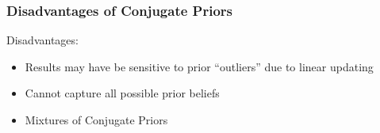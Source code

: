 \documentclass[handout]{beamer}
\begin{document}
\begin{frame}
  \frametitle{Disadvantages of Conjugate Priors}
  Disadvantages: \pause
\begin{itemize}
\item Results  may have be sensitive to prior ``outliers'' due to
  linear updating \pause
\vspace{1.5in}

\item Cannot capture all possible prior beliefs \pause
\item Mixtures of Conjugate Priors
\end{itemize}
\end{frame}
\end{document}
